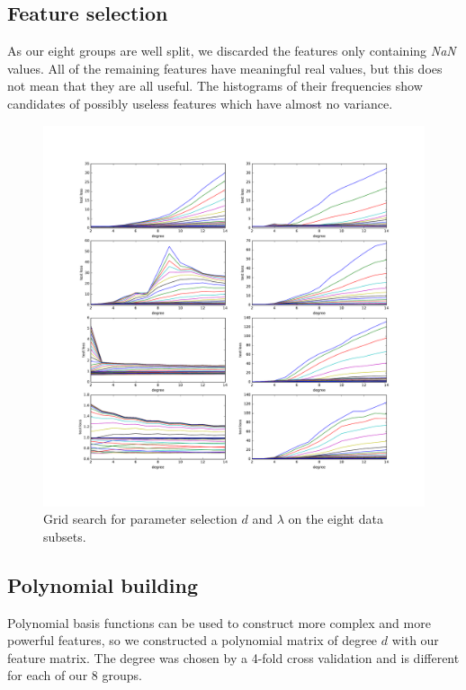 \documentclass[10pt,conference,compsocconf]{IEEEtran}
\begin{document}
\subsection{Feature selection}
As our eight groups are well split, we discarded the features only containing \emph{NaN} values. All of the remaining features have meaningful real values, but this does not mean that they are all useful. The histograms of their frequencies show candidates of possibly useless features which have almost no variance. %

\begin{figure}[tbp] %
  \centering
  \includegraphics[width=\columnwidth]{img/cross_validation_lot.pdf}
  \caption{Grid search for parameter selection $d$ and $\lambda$ on the eight data subsets. }
  \vspace{-3mm}
  \label{param}
\end{figure}

\subsection{Polynomial building}
Polynomial basis functions can be used to construct more complex and more powerful features, so we constructed a polynomial matrix of degree $d$ with our feature matrix. The degree was chosen by a 4-fold cross validation and is different for each of our 8 groups.
\end{document}
